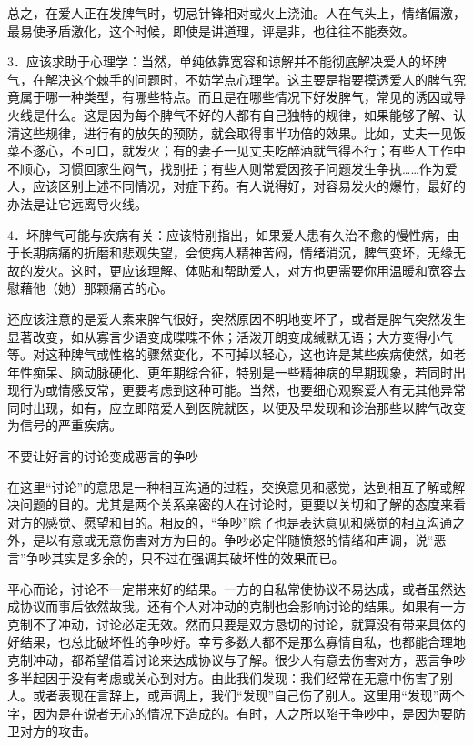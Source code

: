 \documentclass[12pt,UTF8]{ctexbook}
\begin{document}
总之，在爱人正在发脾气时，切忌针锋相对或火上浇油。人在气头上，情绪偏激，最易使矛盾激化，这个时候，即使是讲道理，评是非，也往往不能奏效。

3．应该求助于心理学：当然，单纯依靠宽容和谅解并不能彻底解决爱人的坏脾气，在解决这个棘手的问题时，不妨学点心理学。这主要是指要摸透爱人的脾气究竟属于哪一种类型，有哪些特点。而且是在哪些情况下好发脾气，常见的诱因或导火线是什么。这是因为每个脾气不好的人都有自己独特的规律，如果能够了解、认清这些规律，进行有的放矢的预防，就会取得事半功倍的效果。比如，丈夫一见饭菜不遂心，不可口，就发火；有的妻子一见丈夫吃醉酒就气得不行；有些人工作中不顺心，习惯回家生闷气，找别扭；有些人则常爱因孩子问题发生争执……作为爱人，应该区别上述不同情况，对症下药。有人说得好，对容易发火的爆竹，最好的办法是让它远离导火线。

4．坏脾气可能与疾病有关：应该特别指出，如果爱人患有久治不愈的慢性病，由于长期病痛的折磨和悲观失望，会使病人精神苦闷，情绪消沉，脾气变坏，无缘无故的发火。这时，更应该理解、体贴和帮助爱人，对方也更需要你用温暖和宽容去慰藉他（她）那颗痛苦的心。

还应该注意的是爱人素来脾气很好，突然原因不明地变坏了，或者是脾气突然发生显著改变，如从寡言少语变成喋喋不休；活泼开朗变成缄默无语；大方变得小气等。对这种脾气或性格的骤然变化，不可掉以轻心，这也许是某些疾病使然，如老年性痴呆、脑动脉硬化、更年期综合征，特别是一些精神病的早期现象，若同时出现行为或情感反常，更要考虑到这种可能。当然，也要细心观察爱人有无其他异常同时出现，如有，应立即陪爱人到医院就医，以便及早发现和诊治那些以脾气改变为信号的严重疾病。





不要让好言的讨论变成恶言的争吵


在这里“讨论”的意思是一种相互沟通的过程，交换意见和感觉，达到相互了解或解决问题的目的。尤其是两个关系亲密的人在讨论时，更要以关切和了解的态度来看对方的感觉、愿望和目的。相反的，“争吵”除了也是表达意见和感觉的相互沟通之外，是以有意或无意伤害对方为目的。争吵必定伴随愤怒的情绪和声调，说“恶言”争吵其实是多余的，只不过在强调其破坏性的效果而已。

平心而论，讨论不一定带来好的结果。一方的自私常使协议不易达成，或者虽然达成协议而事后依然故我。还有个人对冲动的克制也会影响讨论的结果。如果有一方克制不了冲动，讨论必定无效。然而只要是双方恳切的讨论，就算没有带来具体的好结果，也总比破坏性的争吵好。幸亏多数人都不是那么寡情自私，也都能合理地克制冲动，都希望借着讨论来达成协议与了解。很少人有意去伤害对方，恶言争吵多半起因于没有考虑或关心到对方。由此我们发现：我们经常在无意中伤害了别人。或者表现在言辞上，或声调上，我们“发现”自己伤了别人。这里用“发现”两个字，因为是在说者无心的情况下造成的。有时，人之所以陷于争吵中，是因为要防卫对方的攻击。
\end{document}

